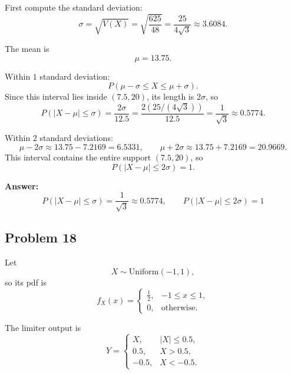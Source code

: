 \documentclass[11pt]{article}
\begin{document}
\begin{enumerate}
    First compute the standard deviation:
    \[
    \sigma=\sqrt{V(X)}=\sqrt{\frac{625}{48}}=\frac{25}{4\sqrt{3}}\approx 3.6084.
    \]

    The mean is
    \[
    \mu=13.75.
    \]

    Within \(1\) standard deviation:
    \[
    P(\mu-\sigma\le X\le \mu+\sigma).
    \]
    Since this interval lies inside \((7.5,20)\), its length is \(2\sigma\), so
    \[
    P(|X-\mu|\le \sigma)=\frac{2\sigma}{12.5}
    =\frac{2(25/(4\sqrt3))}{12.5}
    =\frac{1}{\sqrt3}
    \approx 0.5774.
    \]

    Within \(2\) standard deviations:
    \[
    \mu-2\sigma \approx 13.75-7.2169=6.5331,\qquad
    \mu+2\sigma \approx 13.75+7.2169=20.9669.
    \]
    This interval contains the entire support \((7.5,20)\), so
    \[
    P(|X-\mu|\le 2\sigma)=1.
    \]

    \textbf{Answer:}
    \[
    \boxed{P(|X-\mu|\le \sigma)=\frac{1}{\sqrt3}\approx 0.5774,\qquad P(|X-\mu|\le 2\sigma)=1}
    \]
\end{enumerate}

\subsection*{Problem 18}

Let
\[
X\sim \mathrm{Uniform}(-1,1),
\]
so its pdf is
\[
f_X(x)=
\begin{cases}
\frac12, & -1\le x\le 1,\\[4pt]
0, & \text{otherwise.}
\end{cases}
\]

The limiter output is
\[
Y=
\begin{cases}
X, & |X|\le 0.5,\\
0.5, & X>0.5,\\
-0.5, & X<-0.5.
\end{cases}
\]
\end{document}
